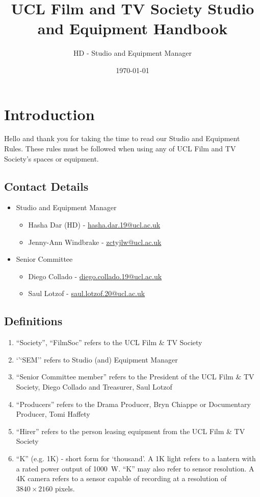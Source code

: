 \documentclass[]{article}
\begin{document}
\title{UCL Film and TV Society Studio and Equipment Handbook}
\author{HD - Studio and Equipment Manager}
\date{\today}
\maketitle
\tableofcontents
\section{Introduction}
Hello and thank you for taking the time to read our Studio and Equipment Rules. These rules must be followed when using any of UCL Film and TV Society's spaces or equipment.
\subsection{Contact Details}
\begin{itemize}
    \item Studio and Equipment Manager
          \begin{itemize}
              \item Hasha Dar (HD) - \href{mailto:hasha.dar.19@ucl.ac.uk}{hasha.dar.19@ucl.ac.uk}
              \item Jenny-Ann Windbrake - \href{mailto:zctyjlw@ucl.ac.uk}{zctyjlw@ucl.ac.uk}
          \end{itemize}
    \item Senior Committee
          \begin{itemize}
              \item Diego Collado - \href{mailto:diego.collado.19@ucl.ac.uk}{diego.collado.19@ucl.ac.uk}
              \item Saul Lotzof - \href{mailto:saul.lotzof.20@ucl.ac.uk}{saul.lotzof.20@ucl.ac.uk}
          \end{itemize}
\end{itemize}
\subsection{Definitions}
\begin{enumerate}
    \item ``Society'', ``FilmSoc'' refers to the UCL Film \& TV Society
    \item `'`SEM'' refers to Studio (and) Equipment Manager
    \item ``Senior Committee member'' refers to the President of the UCL Film \& TV Society, Diego Collado and Treasurer, Saul Lotzof
    \item ``Producers'' refers to the Drama Producer, Bryn Chiappe or Documentary Producer, Tomi Haffety
    \item ``Hirer'' refers to the person leasing equipment from the UCL Film \& TV Society
    \item ``K'' (e.g. 1K) - short form for `thousand'. A 1K light refers to a lantern with a rated power output of \SI{1000}{\watt}. ``K'' may also refer to sensor resolution. A 4K camera refers to a sensor capable of recording at a resolution of $3840 \times 2160$ pixels.
\end{enumerate}
\end{document}
